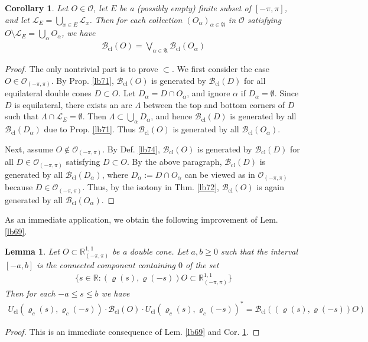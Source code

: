 \documentclass[11pt,b5paper,notitlepage]{article}
\theoremstyle{definition}
\theoremstyle{plain}
\newtheorem{co}[df]{Corollary}
\newtheorem{lm}[df]{Lemma}
\newcommand{\fk}{\mathfrak}
\newcommand{\Rbb}{\mathbb R}
\newcommand{\MO}{\mathcal O}
\newcommand{\Rpp}{\mathbb R^{1,1}_{(-\pi,\pi)}}
\newcommand{\Bcl}{\mathcal B_{\mathrm{cl}}}
\newcommand{\Opp}{\mathcal O_{(-\pi,\pi)}}
\newcommand{\SL}{\mathscr L}
\newcommand{\Ucl}{U_{\mathrm{cl}}}
\numberwithin{equation}{section}
\begin{document}
\begin{co}\label{lb75}
Let $O\in\MO$, let $E$ be a (possibly empty) finite subset of $[-\pi,\pi]$, and let $\SL_E=\bigcup_{x\in E}\SL_x$. Then for each collection $(O_\alpha)_{\alpha\in\fk A}$ in $\MO$ satisfying $O\setminus\SL_E=\bigcup_\alpha O_\alpha$, we have
\begin{align*}
\Bcl(O)=\bigvee_{\alpha\in\fk A}\Bcl(O_\alpha)
\end{align*}
\end{co}

\begin{proof}
The only nontrivial part is to prove $\subset$. We first consider the case $O\in\Opp$. By Prop. \ref{lb71}, $\Bcl(O)$ is generated by $\Bcl(D)$ for all equilateral double cones $D\subset O$. Let $D_\alpha=D\cap O_\alpha$, and ignore $\alpha$ if $D_\alpha=\emptyset$. Since $D$ is equilateral, there exists an arc $\Lambda$ between the top and bottom corners of $D$ such that $\Lambda\cap\SL_E=\emptyset$. Then $\Lambda\subset\bigcup_\alpha D_\alpha$, and hence $\Bcl(D)$ is generated by all $\Bcl(D_\alpha)$ due to Prop. \ref{lb71}. Thus $\Bcl(O)$ is generated by all $\Bcl(O_\alpha)$.

Next, assume $O\notin\Opp$. By Def. \ref{lb74}, $\Bcl(O)$ is generated by $\Bcl(D)$ for all $D\in\Opp$ satisfying $D\subset O$. By the above paragraph, $\Bcl(D)$ is generated by all $\Bcl(D_\alpha)$, where $D_\alpha:=D\cap O_\alpha$ can be viewed as in $\Opp$ because $D\in\Opp$. Thus, by the isotony in Thm. \ref{lb72}, $\Bcl(O)$ is again generated by all $\Bcl(O_\alpha)$.
\end{proof}


As an immediate application, we obtain the following improvement of Lem. \ref{lb69}.

\begin{lm}\label{lb86}
Let $O\subset\Rpp$ be a double cone. Let $a,b\geq0$ such that the interval $[-a,b]$ is the connected component containing $0$ of the set
\begin{align*}
\big\{s\in\Rbb:(\varrho(s),\varrho(-s))O\subset\Rpp\big\}
\end{align*}
Then for each $-a\leq s\leq b$ we have
\begin{align*}
\Ucl(\varrho_c(s),\varrho_c(-s))\cdot\Bcl(O)\cdot\Ucl(\varrho_c(s),\varrho_c(-s))^*=\Bcl((\varrho(s),\varrho(-s))O)
\end{align*}
\end{lm}

\begin{proof}
This is an immediate consequence of Lem. \ref{lb69} and Cor. \ref{lb75}.
\end{proof}
\end{document}
